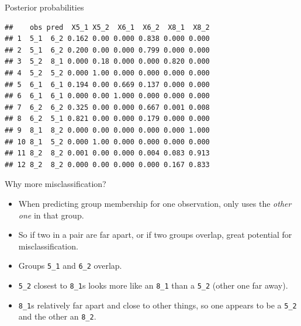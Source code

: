 \documentclass[ignorenonframetext,]{beamer}
\newenvironment{Shaded}{\begin{snugshade}}{\end{snugshade}}
\newcommand{\DataTypeTok}[1]{\textcolor[rgb]{0.13,0.29,0.53}{#1}}
\newcommand{\DecValTok}[1]{\textcolor[rgb]{0.00,0.00,0.81}{#1}}
\newcommand{\KeywordTok}[1]{\textcolor[rgb]{0.13,0.29,0.53}{\textbf{#1}}}
\newcommand{\NormalTok}[1]{#1}
\newcommand{\OperatorTok}[1]{\textcolor[rgb]{0.81,0.36,0.00}{\textbf{#1}}}
\newcommand{\StringTok}[1]{\textcolor[rgb]{0.31,0.60,0.02}{#1}}
\begin{document}
\begin{frame}[fragile]{Posterior probabilities}
\protect\hypertarget{posterior-probabilities-2}{}

\begin{Shaded}
\end{Shaded}

\begin{verbatim}
##    obs pred  X5_1 X5_2  X6_1  X6_2  X8_1  X8_2
## 1  5_1  6_2 0.162 0.00 0.000 0.838 0.000 0.000
## 2  5_1  6_2 0.200 0.00 0.000 0.799 0.000 0.000
## 3  5_2  8_1 0.000 0.18 0.000 0.000 0.820 0.000
## 4  5_2  5_2 0.000 1.00 0.000 0.000 0.000 0.000
## 5  6_1  6_1 0.194 0.00 0.669 0.137 0.000 0.000
## 6  6_1  6_1 0.000 0.00 1.000 0.000 0.000 0.000
## 7  6_2  6_2 0.325 0.00 0.000 0.667 0.001 0.008
## 8  6_2  5_1 0.821 0.00 0.000 0.179 0.000 0.000
## 9  8_1  8_2 0.000 0.00 0.000 0.000 0.000 1.000
## 10 8_1  5_2 0.000 1.00 0.000 0.000 0.000 0.000
## 11 8_2  8_2 0.001 0.00 0.000 0.004 0.083 0.913
## 12 8_2  8_2 0.000 0.00 0.000 0.000 0.167 0.833
\end{verbatim}

\end{frame}

\begin{frame}[fragile]{Why more misclassification?}
\protect\hypertarget{why-more-misclassification}{}

\begin{itemize}
\item
  When predicting group membership for one observation, only uses the
  \emph{other one} in that group.
\item
  So if two in a pair are far apart, or if two groups overlap, great
  potential for misclassification.
\item
  Groups \texttt{5\_1} and \texttt{6\_2} overlap.
\item
  \texttt{5\_2} closest to \texttt{8\_1}s looks more like an
  \texttt{8\_1} than a \texttt{5\_2} (other one far away).
\item
  \texttt{8\_1}s relatively far apart and close to other things, so one
  appears to be a \texttt{5\_2} and the other an \texttt{8\_2}.
\end{itemize}

\end{frame}
\end{document}
